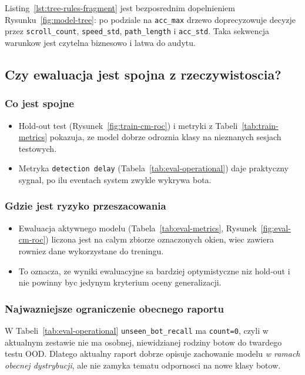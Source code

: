 Listing~\ref{lst:tree-rules-fragment} jest bezposrednim dopelnieniem
Rysunku~\ref{fig:model-tree}: po podziale na \texttt{acc\_max} drzewo
doprecyzowuje decyzje przez \texttt{scroll\_count}, \texttt{speed\_std},
\texttt{path\_length} i \texttt{acc\_std}. Taka sekwencja warunkow jest
czytelna biznesowo i latwa do audytu.

\subsection{Czy ewaluacja jest spojna z rzeczywistoscia?}
\subsubsection{Co jest spojne}
\begin{itemize}
  \item Hold-out test (Rysunek~\ref{fig:train-cm-roc}) i metryki z Tabeli~\ref{tab:train-metrics}
  pokazuja, ze model dobrze odroznia klasy na nieznanych sesjach testowych.
  \item Metryka \texttt{detection delay} (Tabela~\ref{tab:eval-operational}) daje praktyczny sygnal,
  po ilu eventach system zwykle wykrywa bota.
\end{itemize}

\subsubsection{Gdzie jest ryzyko przeszacowania}
\begin{itemize}
  \item Ewaluacja aktywnego modelu (Tabela~\ref{tab:eval-metrics}, Rysunek~\ref{fig:eval-cm-roc})
  liczona jest na calym zbiorze oznaczonych okien, wiec zawiera rowniez dane
  wykorzystane do treningu.
  \item To oznacza, ze wyniki ewaluacyjne sa bardziej optymistyczne niz hold-out
  i nie powinny byc jedynym kryterium oceny generalizacji.
\end{itemize}

\subsubsection{Najwazniejsze ograniczenie obecnego raportu}
W Tabeli~\ref{tab:eval-operational} \texttt{unseen\_bot\_recall} ma \texttt{count=0},
czyli w aktualnym zestawie nie ma osobnej, niewidzianej rodziny botow do twardego testu OOD.
Dlatego aktualny raport dobrze opisuje zachowanie modelu \emph{w ramach obecnej dystrybucji},
ale nie zamyka tematu odpornosci na nowe klasy botow.


